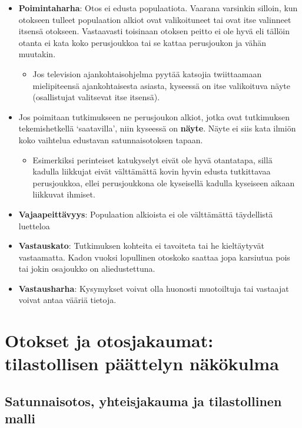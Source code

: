 \documentclass[
]{book}
\providecommand{\tightlist}{%
  \setlength{\itemsep}{0pt}\setlength{\parskip}{0pt}}
\begin{document}
\begin{itemize}
\item
  \textbf{Poimintaharha}: Otos ei edusta populaatiota. Vaarana varsinkin silloin, kun otokseen tulleet populaation alkiot ovat valikoituneet tai ovat itse valinneet itsensä otokseen. Vastaavasti toisinaan otoksen peitto ei ole hyvä eli tällöin otanta ei kata koko perusjoukkoa tai se kattaa perusjoukon ja vähän muutakin.

  \begin{itemize}
  \tightlist
  \item
    Jos television ajankohtaisohjelma pyytää katsojia twiittaamaan mielipiteensä ajankohtaisesta asiasta, kyseessä on itse valikoituva näyte (osallistujat valitsevat itse itsensä).
  \end{itemize}
\item
  Jos poimitaan tutkimukseen ne perusjoukon alkiot, jotka ovat tutkimuksen tekemishetkellä `saatavilla', niin kyseessä on \textbf{näyte}. Näyte ei siis kata ilmiön koko vaihtelua edustavan satunnaisotoksen tapaan.

  \begin{itemize}
  \tightlist
  \item
    Esimerkiksi perinteiset katukyselyt eivät ole hyvä otantatapa, sillä kadulla liikkujat eivät välttämättä kovin hyvin edusta tutkittavaa perusjoukkoa, ellei perusjoukkona ole kyseisellä kadulla kyseiseen aikaan liikkuvat ihmiset.
  \end{itemize}
\item
  \textbf{Vajaapeittävyys}: Populaation alkioista ei ole välttämättä täydellistä luetteloa
\item
  \textbf{Vastauskato}: Tutkimuksen kohteita ei tavoiteta tai he kieltäytyvät vastaamatta. Kadon vuoksi lopullinen otoskoko saattaa jopa karsiutua pois tai jokin osajoukko on aliedustettuna.
\item
  \textbf{Vastausharha}: Kysymykset voivat olla huonosti muotoiltuja tai vastaajat voivat antaa vääriä tietoja.
\end{itemize}

\hypertarget{luku6}{%
\chapter{Otokset ja otosjakaumat: tilastollisen päättelyn näkökulma}\label{luku6}}

\hypertarget{alaluku61}{%
\section{Satunnaisotos, yhteisjakauma ja tilastollinen malli}\label{alaluku61}}
\end{document}
